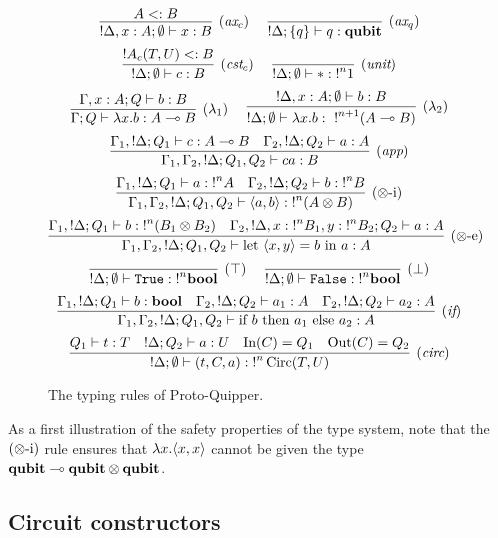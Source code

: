 \documentclass[twoside]{article}
\begin{document}
\begin{figure}[!ht]
\begin{mdframed}
\[
\infer[(\rul{ax}_c)]{{!}\Delta, x:A;\emptyset\entails x:B}{
  A<:B
}
~~~~
\infer[(\rul{ax}_q)]{{!}\Delta;\s{q}\entails q:\qubit}{
} 
\]
\[
\infer[(\rul{cst}_c)]{{!}\Delta;\emptyset \entails c:B}{
  {!}A_{c}(T,U)<:B
} 
~~~~
\infer[(\rul{unit})]{{!}\Delta;\emptyset\entails *:{!}^n 1}{
}
\]
\[
\infer[(\lambda_1)]{\Gamma;Q\entails \lambda x.b:A\loli B}{
  \Gamma,x:A;Q \entails b:B
}
~~~~
\infer[(\lambda_2)]{{!}\Delta;\emptyset \entails \lambda x.b:~{!}^{n+1}(A\loli B)}{
  {!}\Delta, x:A;\emptyset \entails b:B
}
\]
\[
\infer[(\rul{app})]{\Gamma_1,\Gamma_2, {!}\Delta;Q_1,Q_2\entails ca:B}{
  \Gamma_1, {!}\Delta;Q_1\entails c:A\loli B 
  &
  \Gamma_2, {!}\Delta ;Q_2\entails a:A 
}
\]
\[
\infer[(\x\mbox{-i})]{\Gamma_1,\Gamma_2, {!}\Delta;Q_1,Q_2\entails \p{a,b}:{!}^n(A\x B)}{
  \Gamma_1, {!}\Delta;Q_1\entails a:{!}^nA 
  &
  \Gamma_2, {!}\Delta ;Q_2\entails b:{!}^nB
}
\]
\[
\infer[(\x\mbox{-e})]{\Gamma_1,\Gamma_2, {!}\Delta;Q_1,Q_2\entails \letin{\p{x,y}}{b}{a}:A}{
  \Gamma_1, {!}\Delta;Q_1\entails b:{!}^n(B_1\x B_2) 
  &
  \Gamma_2, {!}\Delta, x:{!}^nB_1, y:{!}^nB_2 ;Q_2\entails a:A
}
\]
\[
\infer[(\top)]{{!}\Delta;\emptyset\entails \true:{!}^n \bool}{
} 
~~~~
\infer[(\bot)]{{!}\Delta;\emptyset\entails \false:{!}^n \bool}{
}
\]
\[
\infer[(\rul{if})]{\Gamma_1,\Gamma_2, {!}\Delta;Q_1,Q_2\entails \ifthenelse{b}{a_1}{a_2}:A}{
  \Gamma_1, {!}\Delta;Q_1\entails b:\bool 
  &
  \Gamma_2, {!}\Delta;Q_2 \entails a_1:A ~~~ \Gamma_2, {!}\Delta;Q_2 \entails a_2:A
}
\]
\[
\infer[(\rul{circ})]{{!}\Delta;\emptyset \entails (t,C,a):{!}^n\Circ(T,U)}{
  Q_1\entails t:T 
  &
  {!}\Delta ; Q_2\entails a:U 
  &
  \In(C)=Q_1 
  &
  \Out(C)=Q_2
}
\]
\end{mdframed}
\caption{The typing rules of Proto-Quipper.}
\label{trules}
\end{figure}

As a first illustration of the safety properties of the type system,
note that the $(\otimes\mbox{-i})$ rule ensures that $\lambda x. \langle x,x\rangle$
cannot be given the type $\textrm{\bf qubit}\multimap \textrm{\bf qubit} \otimes \textrm{\bf qubit}$.


\subsection{Circuit constructors}\label{ssec-circuit-cons}
\end{document}
